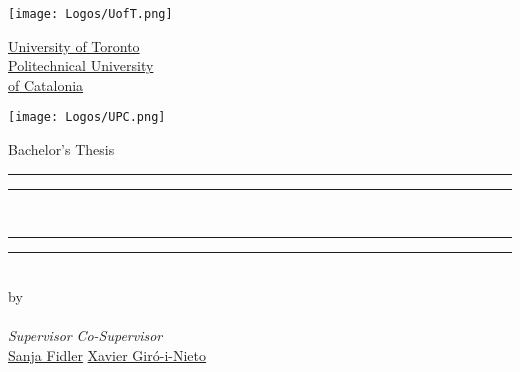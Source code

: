 

%   




\cleardoublepage
\begin{titlepage}
  \makeatletter
  \hypersetup{
    urlcolor = black
  }

  \centering
  \scshape \Large

  \begin{minipage}[c]{.2\textwidth}
    \texttt{[image: Logos/UofT.png]}
  \end{minipage}\hfill
  \begin{minipage}[c]{.5\textwidth}
    \centering
    \href{https://href.com}{University of Toronto} \\[2ex]
    \href{https://href.com}{Politechnical University \\ of Catalonia}
  \end{minipage}\hfill
  \begin{minipage}[c]{.2\textwidth}
    \texttt{[image: Logos/UPC.png]}
  \end{minipage}

  \vfill

  Bachelor's Thesis \\[-1.5ex]
  \LARGE
  \rule{\textwidth}{1.6pt}\vspace*{-\baselineskip}\vspace*{2pt}
  \rule{\textwidth}{0.4pt}
  \textbf{\href{https://href.com}{\@title}} \\[-1ex]
  \rule{\textwidth}{0.4pt}\vspace*{-\baselineskip}\vspace*{3.2pt}
  \rule{\textwidth}{1.6pt} \\
  \Large
  by \\
  \LARGE
  \textbf{\href{http://href.com}{\@author}} \\[1ex]
  \large
  \noindent \textsl{Supervisor} \hfill \textsl{Co-Supervisor} \\
  \href{https://href.com}{Sanja Fidler}\hfill
  \href{https://href.com}{Xavier Giró-i-Nieto}


\end{titlepage}
